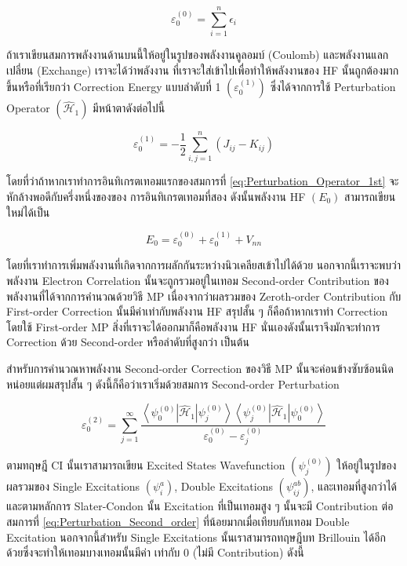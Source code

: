 \begin{equation}
    \varepsilon_{0}^{(0)} = \sum_{i=1}^{n} \epsilon_{i}
\end{equation}

\noindent ถ้าเราเขียนสมการพลังงานด้านบนนี้ให้อยู่ในรูปของพลังงานคูลอมบ์ (Coulomb) และพลังงานแลกเปลี่ยน (Exchange) เราจะได้ว่าพลังงาน%
ที่เราจะใส่เข้าไปเพื่อทำให้พลังงานของ HF นั้นถูกต้องมากขึ้นหรือที่เรียกว่า Correction Energy แบบลำดับที่ 1 $(\varepsilon_{0}^{(1)})$ 
ซึ่งได้จากการใช้ Perturbation Operator $(\hat{\mathscr{H}}_1)$ มีหน้าตาดังต่อไปนี้ 

\begin{equation}
    \varepsilon_{0}^{(1)} = -\frac{1}{2} \sum_{i, j=1}^{n}\left(J_{i j}-K_{i j}\right)
\end{equation}

\noindent โดยที่ว่าถ้าหากเราทำการอินทิเกรตเทอมแรกของสมการที่ \ref{eq:Perturbation_Operator_1st} จะหักล้างพอดีกับครึ่งหนึ่งของของ%
การอินทิเกรตเทอมที่สอง ดังนั้นพลังงาน HF $(E_{0})$ สามารถเขียนใหม่ได้เป็น 

\begin{equation}
    E_{0} = \varepsilon_{0}^{(0)}+\varepsilon_{0}^{(1)}+V_{n n}
\end{equation}

\noindent โดยที่เราทำการเพิ่มพลังงานที่เกิดจากการผลักกันระหว่างนิวเคลียสเข้าไปได้ด้วย นอกจากนี้เราจะพบว่าพลังงาน Electron Correlation 
นั้นจะถูกรวมอยู่ในเทอม Second-order Contribution ของพลังงานที่ได้จากการคำนวณด้วยวิธี MP เนื่องจากว่าผลรวมของ Zeroth-order 
Contribution กับ First-order Correction นั้นมีค่าเท่ากับพลังงาน HF สรุปสั้น ๆ ก็คือถ้าหากเราทำ Correction โดยใช้ First-order 
MP สิ่งที่เราจะได้ออกมาก็คือพลังงาน HF นั่นเองดังนั้นเราจึงมักจะทำการ Correction ด้วย Second-order หรือลำดับที่สูงกว่า เป็นต้น

สำหรับการคำนวณหาพลังงาน Second-order Correction ของวิธี MP นั้นจะค่อนข้างซับซ้อนนิดหน่อยแต่ผมสรุปสั้น ๆ ดังนี้ก็คือว่าเราเริ่มด้วยสมการ 
Second-order Perturbation

\begin{equation}
    \label{eq:Perturbation_Second_order}
    \varepsilon_{0}^{(2)} 
    = \sum_{j=1}^{\infty} 
        \frac{\left\langle\psi_{0}^{(0)}\left|\hat{\mathscr{H}}_{1}\right| \psi_{j}^{(0)}\right\rangle
            \left\langle\psi_{j}^{(0)}\left|\hat{\mathscr{H}}_{1}\right| \psi_{0}^{(0)}\right\rangle}
        {\varepsilon_{0}^{(0)}-\varepsilon_{j}^{(0)}}
\end{equation}

\noindent ตามทฤษฎี CI นั้นเราสามารถเขียน Excited States Wavefunction $(\psi_{j}^{(0)})$ ให้อยู่ในรูปของผลรวมของ Single 
Excitations $(\psi_{i}^{a})$, Double Excitations $(\psi_{i j}^{a b})$, และเทอมที่สูงกว่าได้ และตามหลักการ Slater-Condon 
นั้น Excitation ที่เป็นเทอมสูง ๆ นั้นจะมี Contribution ต่อสมการที่ \ref{eq:Perturbation_Second_order} ที่น้อยมากเมื่อเทียบกับเทอม 
Double Excitation นอกจากนี้สำหรับ Single Excitations นั้นเราสามารถทฤษฎีบท Brillouin ได้อีกด้วยซึ่งจะทำให้เทอมบางเทอมนั้นมีค่า%
เท่ากับ 0 (ไม่มี Contribution) ดังนี้

